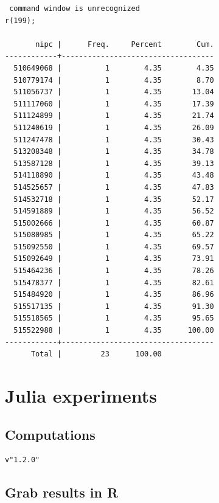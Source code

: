 \documentclass[
  12pt,
]{article}
\begin{document}
\begin{verbatim}
 command window is unrecognized
r(199);

       nipc |      Freq.     Percent        Cum.
------------+-----------------------------------
  510649068 |          1        4.35        4.35
  510779174 |          1        4.35        8.70
  511056737 |          1        4.35       13.04
  511117060 |          1        4.35       17.39
  511124899 |          1        4.35       21.74
  511240619 |          1        4.35       26.09
  511247478 |          1        4.35       30.43
  513208348 |          1        4.35       34.78
  513587128 |          1        4.35       39.13
  514118890 |          1        4.35       43.48
  514525657 |          1        4.35       47.83
  514532718 |          1        4.35       52.17
  514591889 |          1        4.35       56.52
  515002666 |          1        4.35       60.87
  515080985 |          1        4.35       65.22
  515092550 |          1        4.35       69.57
  515092649 |          1        4.35       73.91
  515464236 |          1        4.35       78.26
  515478377 |          1        4.35       82.61
  515484920 |          1        4.35       86.96
  515517135 |          1        4.35       91.30
  515518565 |          1        4.35       95.65
  515522988 |          1        4.35      100.00
------------+-----------------------------------
      Total |         23      100.00
\end{verbatim}

\hypertarget{julia-experiments}{%
\section{Julia experiments}\label{julia-experiments}}

\hypertarget{computations}{%
\subsection{Computations}\label{computations}}

\begin{verbatim}
v"1.2.0"
\end{verbatim}

\hypertarget{grab-results-in-r}{%
\subsection{Grab results in R}\label{grab-results-in-r}}
\end{document}
